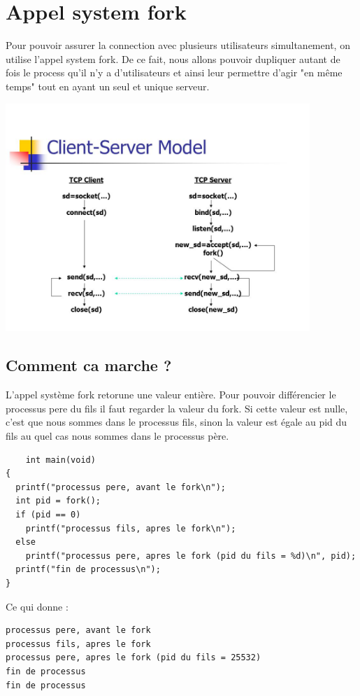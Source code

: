\documentclass[a4paper,11pt]{report}
\begin{document}
\section{Appel system fork}
Pour pouvoir assurer la connection avec plusieurs utilisateurs simultanement, on utilise l'appel system fork. De ce fait, nous allons pouvoir dupliquer autant de fois le process qu'il n'y a d'utilisateurs et ainsi leur permettre d'agir "en même temps" tout en ayant un seul et unique serveur.

\includegraphics[width=115mm]{../resources/socketFork.jpg}

\subsection{Comment ca marche ?}
L'appel système fork retorune une valeur entière. Pour pouvoir différencier le processus pere du fils il faut regarder la valeur du fork. Si cette valeur est nulle, c'est que nous sommes dans le processus fils, sinon la valeur est égale au pid du fils au quel cas nous sommes dans le processus père.


\begin{lstlisting} 
    int main(void)
{
  printf("processus pere, avant le fork\n");
  int pid = fork();
  if (pid == 0)
    printf("processus fils, apres le fork\n");
  else
    printf("processus pere, apres le fork (pid du fils = %d)\n", pid);
  printf("fin de processus\n");
}
\end{lstlisting}
Ce qui donne :
\begin{lstlisting} 
processus pere, avant le fork
processus fils, apres le fork
processus pere, apres le fork (pid du fils = 25532)
fin de processus
fin de processus
\end{lstlisting}
\end{document}
